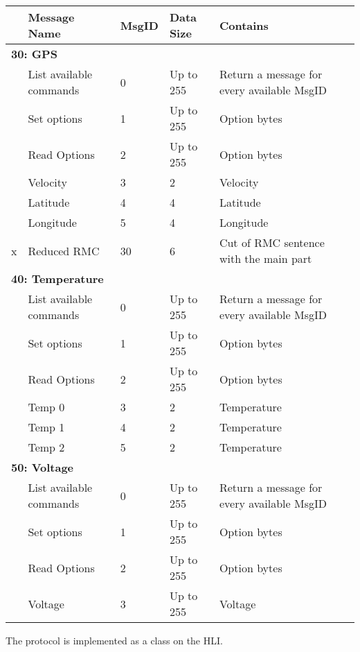 \begin{sidewaystable}[h!]
\centering
	\begin{tabular}{lllll}
	\toprule
	& \textbf{Message Name} & \textbf{MsgID} & \textbf{Data Size} & \textbf{Contains}\\
	\midrule
	\multicolumn{5}{l}{\textbf{30: GPS}}\\
	\midrule
	& List available commands & 0 & Up to 255 & Return a message for every available MsgID\\
	& Set options & 1 & Up to 255 & Option bytes\\
	& Read Options & 2 & Up to 255 & Option bytes\\
	& Velocity & 3 & 2 & Velocity\\
	& Latitude & 4 & 4 & Latitude\\
	& Longitude & 5 & 4 & Longitude\\
	x& Reduced RMC & 30 & 6 & Cut of RMC sentence with the main part\\
	\midrule
	\multicolumn{5}{l}{\textbf{40: Temperature}}\\
	\midrule
	& List available commands & 0 & Up to 255 & Return a message for every available MsgID\\
	& Set options & 1 & Up to 255 & Option bytes\\
	& Read Options & 2 & Up to 255 & Option bytes\\
	& Temp 0 & 3 & 2 & Temperature \\
	& Temp 1 & 4 & 2 & Temperature \\
	& Temp 2 & 5 & 2 & Temperature \\
	\midrule
	\multicolumn{5}{l}{\textbf{50: Voltage}}\\
	\midrule
	& List available commands & 0 & Up to 255 & Return a message for every available MsgID\\
	& Set options & 1 & Up to 255 & Option bytes\\
	& Read Options & 2 & Up to 255 & Option bytes\\
	& Voltage & 3 & Up to 255 & Voltage\\
	\bottomrule
	\end{tabular}
\caption{}
\label{tab:msg4}
\end{sidewaystable}

The protocol is implemented as a class on the HLI.
